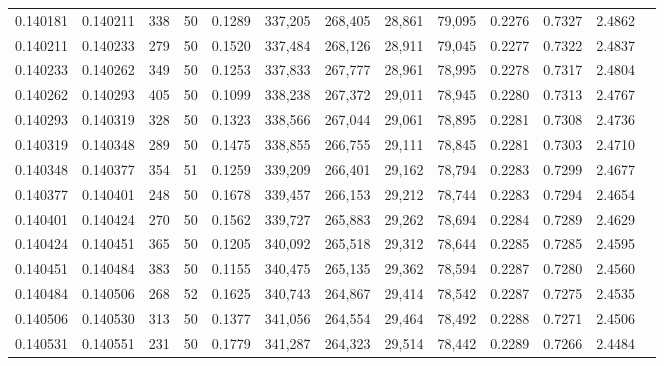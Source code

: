 \begin{tabular}{rrrrrrrrrrrrr}
0.140181 & 0.140211 &   338 &  50 &                                     0.1289 & 337,205 & 268,405 &  28,861 &  79,095 & 0.2276 & 0.7327 & 2.4862 \\
0.140211 & 0.140233 &   279 &  50 &                                     0.1520 & 337,484 & 268,126 &  28,911 &  79,045 & 0.2277 & 0.7322 & 2.4837 \\
0.140233 & 0.140262 &   349 &  50 &                                     0.1253 & 337,833 & 267,777 &  28,961 &  78,995 & 0.2278 & 0.7317 & 2.4804 \\
0.140262 & 0.140293 &   405 &  50 &                                     0.1099 & 338,238 & 267,372 &  29,011 &  78,945 & 0.2280 & 0.7313 & 2.4767 \\
0.140293 & 0.140319 &   328 &  50 &                                     0.1323 & 338,566 & 267,044 &  29,061 &  78,895 & 0.2281 & 0.7308 & 2.4736 \\
0.140319 & 0.140348 &   289 &  50 &                                     0.1475 & 338,855 & 266,755 &  29,111 &  78,845 & 0.2281 & 0.7303 & 2.4710 \\
0.140348 & 0.140377 &   354 &  51 &                                     0.1259 & 339,209 & 266,401 &  29,162 &  78,794 & 0.2283 & 0.7299 & 2.4677 \\
0.140377 & 0.140401 &   248 &  50 &                                     0.1678 & 339,457 & 266,153 &  29,212 &  78,744 & 0.2283 & 0.7294 & 2.4654 \\
0.140401 & 0.140424 &   270 &  50 &                                     0.1562 & 339,727 & 265,883 &  29,262 &  78,694 & 0.2284 & 0.7289 & 2.4629 \\
0.140424 & 0.140451 &   365 &  50 &                                     0.1205 & 340,092 & 265,518 &  29,312 &  78,644 & 0.2285 & 0.7285 & 2.4595 \\
0.140451 & 0.140484 &   383 &  50 &                                     0.1155 & 340,475 & 265,135 &  29,362 &  78,594 & 0.2287 & 0.7280 & 2.4560 \\
0.140484 & 0.140506 &   268 &  52 &                                     0.1625 & 340,743 & 264,867 &  29,414 &  78,542 & 0.2287 & 0.7275 & 2.4535 \\
0.140506 & 0.140530 &   313 &  50 &                                     0.1377 & 341,056 & 264,554 &  29,464 &  78,492 & 0.2288 & 0.7271 & 2.4506 \\
0.140531 & 0.140551 &   231 &  50 &                                     0.1779 & 341,287 & 264,323 &  29,514 &  78,442 & 0.2289 & 0.7266 & 2.4484 \\

\end{tabular}
